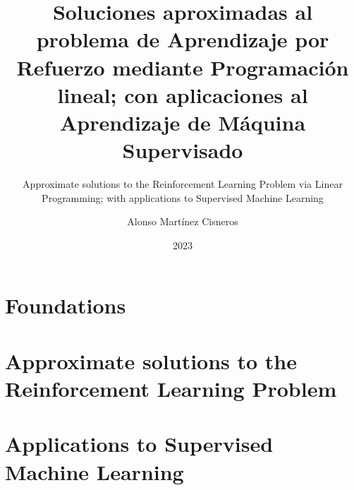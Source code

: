 \documentclass[colorful]{sty/itam-thesis}
\author{Alonso Martínez Cisneros}
\title{%
	Soluciones aproximadas al problema de Aprendizaje por Refuerzo mediante
	Programación lineal; con aplicaciones al Aprendizaje de Máquina Supervisado%
}
\subtitle{%
	Approximate solutions to the Reinforcement Learning Problem via Linear
	Programming; with applications to Supervised Machine Learning%
}
\date{2023}
\begin{document}
\pagestyle{plain}

\frontmatter
{}
\maketitle
\makefrontmatter






{
	\hypersetup{hidelinks}

	\tableofcontents
	\listofalgorithms
}

\cleardoublepage
\mainmatter

\pagestyle{plain}

% 


\part{Foundations}
\label{part:I}

	
	
	

\part{Approximate solutions to the Reinforcement Learning Problem}
\label{part:II}

	
	
	
\part{Applications to Supervised Machine Learning}
\label{part:III}

	
	
	

\appendix
{}

	
	

\nocite{*}
\printbibliography
\end{document}
